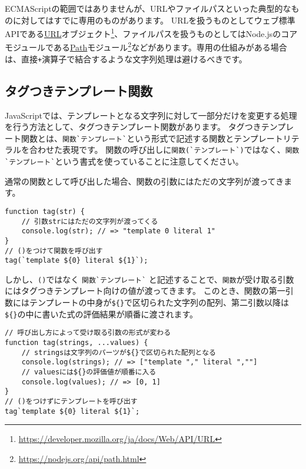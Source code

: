 ECMAScriptの範囲ではありませんが、URLやファイルパスといった典型的なものに対してはすでに専用のものがあります。
URLを扱うものとしてウェブ標準APIである\href{https://developer.mozilla.org/ja/docs/Web/API/URL}{URL}オブジェクト\footnote{\url{https://developer.mozilla.org/ja/docs/Web/API/URL}}、ファイルパスを扱うものとしてはNode.jsのコアモジュールである\href{https://nodejs.org/api/path.html}{Path}モジュール\footnote{\url{https://nodejs.org/api/path.html}}などがあります。専用の仕組みがある場合は、直接\texttt{+}演算子で結合するような文字列処理は避けるべきです。

\hypertarget{tagged-template-function}{%
\subsection{タグつきテンプレート関数\protect{}}\label{tagged-template-function}}

JavaScriptでは、テンプレートとなる文字列に対して一部分だけを変更する処理を行う方法として、タグつきテンプレート関数があります。
タグつきテンプレート関数とは、\texttt{関数}\lstinline{`}\texttt{テンプレート}\lstinline{`}という形式で記述する関数とテンプレートリテラルを合わせた表現です。
関数の呼び出しに\texttt{関数}\lstinline{(`}\texttt{テンプレート}\lstinline{`)}ではなく、\texttt{関数}\lstinline{`}\texttt{テンプレート}\lstinline{`}という書式を使っていることに注意してください。

通常の関数として呼び出した場合、関数の引数にはただの文字列が渡ってきます。

\begin{lstlisting}
function tag(str) {
    // 引数strにはただの文字列が渡ってくる
    console.log(str); // => "template 0 literal 1"
}
// ()をつけて関数を呼び出す
tag(`template ${0} literal ${1}`);
\end{lstlisting}

しかし、\texttt{()}ではなく
\texttt{関数}\lstinline{`}\texttt{テンプレート}\lstinline{`}
と記述することで、\texttt{関数}が受け取る引数にはタグつきテンプレート向けの値が渡ってきます。
このとき、関数の第一引数にはテンプレートの中身が\texttt{\$\{\}}で区切られた文字列の配列、第二引数以降は\texttt{\$\{\}}の中に書いた式の評価結果が順番に渡されます。

\begin{lstlisting}
// 呼び出し方によって受け取る引数の形式が変わる
function tag(strings, ...values) {
    // stringsは文字列のパーツが${}で区切られた配列となる
    console.log(strings); // => ["template "," literal ",""]
    // valuesには${}の評価値が順番に入る
    console.log(values); // => [0, 1]
}
// ()をつけずにテンプレートを呼び出す
tag`template ${0} literal ${1}`;
\end{lstlisting}

